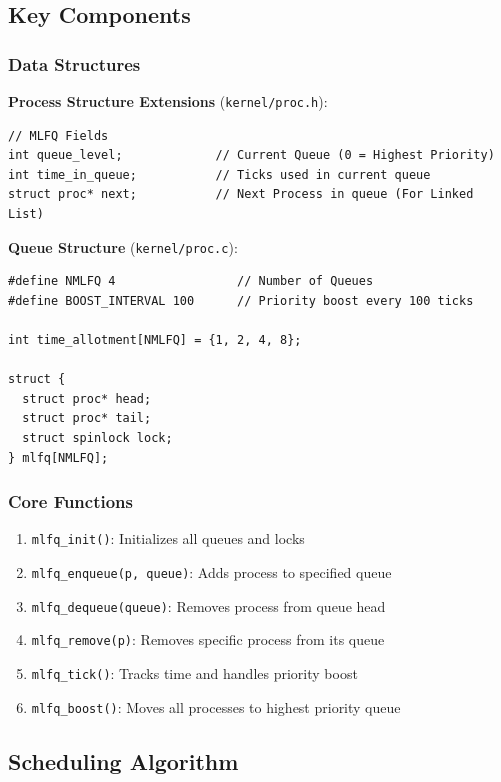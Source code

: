 \documentclass[11pt,a4paper]{article}
\begin{document}
\subsection{Key Components}

\subsubsection{Data Structures}

\textbf{Process Structure Extensions} (\texttt{kernel/proc.h}):
\begin{lstlisting}
// MLFQ Fields
int queue_level;             // Current Queue (0 = Highest Priority)
int time_in_queue;           // Ticks used in current queue
struct proc* next;           // Next Process in queue (For Linked List)
\end{lstlisting}

\textbf{Queue Structure} (\texttt{kernel/proc.c}):
\begin{lstlisting}
#define NMLFQ 4                 // Number of Queues
#define BOOST_INTERVAL 100      // Priority boost every 100 ticks

int time_allotment[NMLFQ] = {1, 2, 4, 8};

struct {
  struct proc* head;
  struct proc* tail;
  struct spinlock lock;
} mlfq[NMLFQ];
\end{lstlisting}

\subsubsection{Core Functions}

\begin{enumerate}
    \item \texttt{mlfq\_init()}: Initializes all queues and locks
    \item \texttt{mlfq\_enqueue(p, queue)}: Adds process to specified queue
    \item \texttt{mlfq\_dequeue(queue)}: Removes process from queue head
    \item \texttt{mlfq\_remove(p)}: Removes specific process from its queue
    \item \texttt{mlfq\_tick()}: Tracks time and handles priority boost
    \item \texttt{mlfq\_boost()}: Moves all processes to highest priority queue
\end{enumerate}

\subsection{Scheduling Algorithm}
\end{document}
